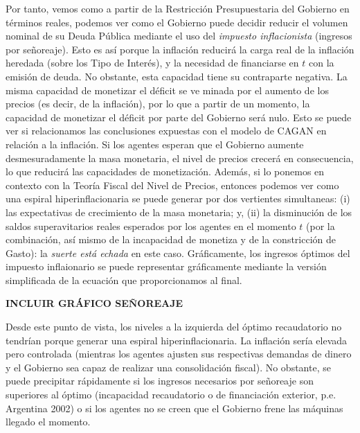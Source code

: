 \documentclass[10pt,a4paper]{article}
\begin{document}
Por tanto, vemos como a partir de la Restricción Presupuestaria del Gobierno en términos reales, podemos ver como el Gobierno puede decidir reducir el volumen nominal de su Deuda Pública mediante el uso del \textit{impuesto inflacionista} (ingresos por señoreaje). Esto es así porque la inflación reducirá la carga real de la inflación heredada (sobre los Tipo de Interés), y la necesidad de financiarse en $t$ con la emisión de deuda. No obstante, esta capacidad tiene su contraparte negativa. La misma capacidad de monetizar el déficit se ve minada por el aumento de los precios (es decir, de la inflación), por lo que a partir de un momento, la capacidad de monetizar el déficit por parte del Gobierno será nulo. Esto se puede ver si relacionamos las conclusiones expuestas con el modelo de CAGAN en relación a la inflación. Si los agentes esperan que el Gobierno aumente desmesuradamente la masa monetaria, el nivel de precios crecerá en consecuencia, lo que reducirá las capacidades de monetización. Además, si lo ponemos en contexto con la Teoría Fiscal del Nivel de Precios, entonces podemos ver como una espiral hiperinflacionaria se puede generar por dos vertientes simultaneas: (i) las expectativas de crecimiento de la masa monetaria; y, (ii) la disminución de los saldos superavitarios reales esperados por los agentes en el momento $t$ (por la combinación, así mismo de la incapacidad de monetiza y de la constricción de Gasto): la \textit{suerte está echada} en este caso. Gráficamente, los ingresos óptimos del impuesto inflaionario se puede representar gráficamente mediante la versión simplificada de la ecuación que proporcionamos al final.

\textbf{INCLUIR GRÁFICO SEÑOREAJE}

Desde este punto de vista, los niveles a la izquierda del óptimo recaudatorio no tendrían porque generar una espiral hiperinflacionaria. La inflación sería elevada pero controlada (mientras los agentes ajusten sus respectivas demandas de dinero y el Gobierno sea capaz de realizar una consolidación fiscal). No obstante, se puede precipitar rápidamente si los ingresos necesarios por señoreaje son superiores al óptimo (incapacidad recaudatorio o de financiación exterior, p.e. Argentina 2002) o si los agentes no se creen que el Gobierno frene las máquinas llegado el momento.
\end{document}
